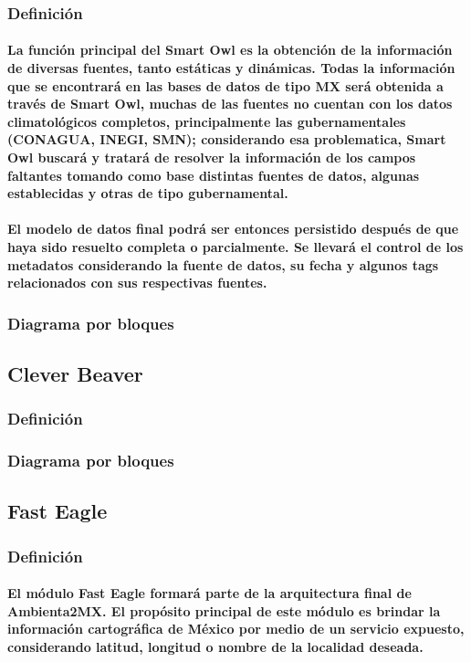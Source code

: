     \subsubsection{Definición}
      \paragraph{La función principal del Smart Owl es la obtención de la información de diversas fuentes, tanto estáticas y dinámicas. Todas la información que se encontrará en las bases de datos de tipo MX será obtenida a través de Smart Owl, muchas de las fuentes no cuentan con los datos climatológicos completos, principalmente las gubernamentales (CONAGUA, INEGI, SMN); considerando esa problematica, Smart Owl buscará y tratará de resolver la información de los campos faltantes tomando como base distintas fuentes de datos, algunas establecidas y otras de tipo gubernamental.}
      \paragraph{El modelo de datos final podrá ser entonces persistido después de que haya sido resuelto completa o parcialmente. Se llevará el control de los metadatos considerando la fuente de datos, su fecha y algunos tags relacionados con sus respectivas fuentes.}
    \subsubsection{Diagrama por bloques}
  \subsection{Clever Beaver}
    \subsubsection{Definición}
    \subsubsection{Diagrama por bloques}
  \subsection{Fast Eagle}
    \subsubsection{Definición}
      \paragraph{El módulo Fast Eagle formará parte de la arquitectura final de Ambienta2MX. El propósito principal de este módulo es brindar la información cartográfica de México por medio de un servicio expuesto, considerando latitud, longitud o nombre de la localidad deseada.}
